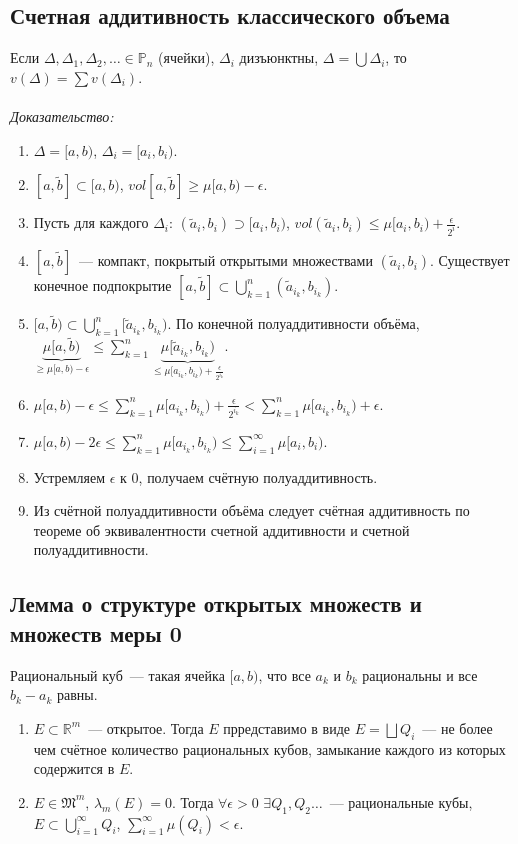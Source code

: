 \documentclass[paper=a4, fontsize=11pt]{article}
\begin{document}
\subsection{Счетная аддитивность классического объема}
Если $\Delta, \Delta_1, \Delta_2, \dots \in \mathds{P}_n$ (ячейки), $\Delta_i$ дизъюнктны, $\Delta = \bigcup \Delta_i$,
то $v(\Delta) = \sum v(\Delta_i)$.
\\\\
\emph{Доказательство:}
\begin{enumerate}
    \item $\Delta = [a,b)$, $\Delta_i = [a_i,b_i)$.
    \item $[a,\widetilde{b}] \subset [a,b)$, $vol[a,\widetilde{b}] \geq \mu[a,b) - \epsilon$.
    \item Пусть для каждого $\Delta_i$: $(\widetilde{a}_i,b_i) \supset [a_i,b_i)$,
    $vol(\widetilde{a}_i,b_i) \leq \mu[a_i,b_i) + \frac{\epsilon}{2^i}$.
    \item $[a,\widetilde{b}]$~--- компакт, покрытый открытыми множествами $(\widetilde{a}_i,b_i)$.
    Существует конечное подпокрытие $[a,\widetilde{b}] \subset \bigcup_{k=1}^n (\widetilde{a}_{i_k},b_{i_k})$.
    \item $[a,\widetilde{b}) \subset \bigcup_{k=1}^n [\widetilde{a}_{i_k},b_{i_k})$.
    По конечной полуаддитивности объёма,
    $\underbrace{\mu[a,\widetilde{b})}_{\geq \mu[a,b) - \epsilon} \leq
    \sum_{k=1}^n \underbrace{\mu[\widetilde{a}_{i_k},b_{i_k})}_{\leq \mu[a_{i_k},b_{i_k}) + \frac{\epsilon}{2^{i_k}}}$.
    \item $\mu[a,b)-\epsilon \leq \sum_{k=1}^n \mu[a_{i_k},b_{i_k}) + \frac{\epsilon}{2^{i_k}} <
    \sum_{k=1}^n \mu[a_{i_k},b_{i_k}) + \epsilon$.
    \item $\mu[a,b) - 2\epsilon \leq \sum_{k=1}^n \mu[a_{i_k},b_{i_k}) \leq \sum_{i=1}^{\infty} \mu[a_i,b_i)$. 
    \item Устремляем $\epsilon$ к 0, получаем счётную полуаддитивность.
    \item Из счётной полуаддитивности объёма следует счётная аддитивность по теореме об
    эквивалентности счетной аддитивности и счетной полуаддитивности.
\end{enumerate}

\subsection{Лемма о структуре открытых множеств и множеств меры 0}
Рациональный куб~--- такая ячейка $[a,b)$, что все $a_k$ и $b_k$ рациональны и все $b_k-a_k$ равны.
\begin{enumerate}
    \item $E \subset \mathds{R}^m$~--- открытое. Тогда $E$ прредставимо в виде $E = \bigsqcup Q_i$~---
    не более чем счётное количество рациональных кубов, замыкание каждого из которых содержится в $E$.
    \item $E \in \mathfrak{M}^m$, $\lambda_m(E) = 0$. Тогда $\forall \epsilon > 0$ $\exists Q_1,Q_2\dots$~--- рациональные кубы,
    $E \subset \bigcup_{i=1}^{\infty} Q_i$, $\sum_{i=1}^{\infty} \mu(Q_i) < \epsilon$.
\end{enumerate}
\end{document}
